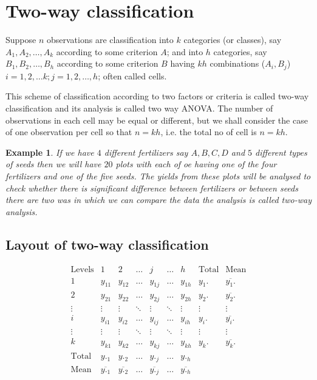 \documentclass[oneside,11pt,pdftex]{book}%
\numberwithin{equation}{section}
\newtheorem{example}[theorem]{Example}
\numberwithin{section}{chapter}
\numberwithin{equation}{chapter}
\begin{document}
\section{Two-way classification}
Suppose $ n $ observations are classification into $ k $ categories (or classes), say $ A_1, A_2, \dots, A_k $ according to some criterion $ A $; and into $ h $ categories, say $ B_1, B_2, \dots, B_h $ according to some criterion $ B$ having $ kh $ combinations ($ A_i,B_j $) $ i=1,2,\dots k; j=1,2,\dots, h $; often called cells.\par
This scheme of classification according to two factors or criteria is called two-way classification and its analysis is called two way ANOVA. The number of observations in each cell may be equal or different, but we shall consider the case of one observation per cell so that $ n=kh $, i.e. the total no of cell is $ n=kh $.

\begin{example}
	If we have $ 4 $ different fertilizers say $ A,B,C,D $ and $ 5 $ different types of seeds then we will have $ 20 $ plots with each of oe having one of the four fertilizers and one of the five seeds. The yields from these plots will be analysed to check whether there is significant difference between fertilizers or between seeds there are two was in which we can compare the data the analysis is called two-way analysis.
\end{example}

\subsection{Layout of two-way classification}
\[ \begin{matrix}
	\text{Levels} & 1 & 2 & \dots & j & \dots & h & \text{Total} & \text{Mean}\\
	1 & y_{11} & y_{12} & \dots & y_{1j} & \dots & y_{1h} & y_1. & \overline{y_1.}\\
	2 & y_{21} & y_{22} & \dots & y_{2j} & \dots & y_{2h} & y_2. & \overline{y_2.}\\
	\vdots & \vdots & \vdots & \ddots & \vdots & \ddots & \vdots & \vdots & \vdots\\
	i & y_{i1} & y_{i2} & \dots & y_{ij} & \dots & y_{ih} & y_i. & \overline{y_i.}\\
	\vdots & \vdots & \vdots & \ddots & \vdots & \ddots & \vdots & \vdots & \vdots\\
	k & y_{k1} & y_{k2} & \dots & y_{kj} & \dots & y_{kh} & y_k. & \overline{y_k.}\\
	\text{Total} & y._1 & y._2 & \dots & y._j & \dots & y._h &  & \\
	\text{Mean} & \overline{y._1} & \overline{y._2} & \dots & \overline{y._j} & \dots & \overline{y._h} &  & \\
\end{matrix} \]
\end{document}
